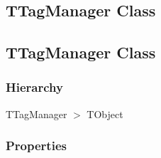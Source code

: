 \documentclass{report}
\begin{document}
\subsection*{\large{\textbf{TTagManager Class}}\normalsize\hspace{1ex}\hrulefill}
\else
\subsection*{TTagManager Class}
\fi
\label{PasDoc_TagManager.TTagManager}
\subsubsection*{\large{\textbf{Hierarchy}}\normalsize\hspace{1ex}\hfill}
TTagManager {$>$} TObject
\subsubsection*{\large{\textbf{Properties}}\normalsize\hspace{1ex}\hfill}
\end{document}
